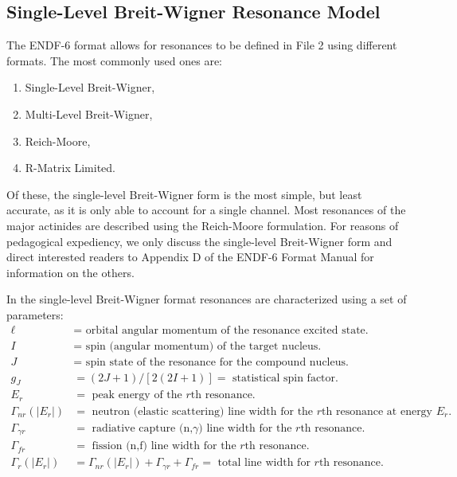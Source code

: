 \subsection{Single-Level Breit-Wigner Resonance Model}

The ENDF-6 format allows for resonances to be defined in File 2 using different formats. The most commonly used ones are:
\begin{enumerate}
  \item Single-Level Breit-Wigner,
  \item Multi-Level Breit-Wigner,
  \item Reich-Moore,
  \item R-Matrix Limited.
\end{enumerate}

Of these, the single-level Breit-Wigner form is the most simple, but least accurate, as it is only able to account for a single channel. Most resonances of the major actinides are described using the Reich-Moore formulation. For reasons of pedagogical expediency, we only discuss the single-level Breit-Wigner form and direct interested readers to Appendix D of the ENDF-6 Format Manual for information on the others. 

In the single-level Breit-Wigner format resonances are characterized using a set of parameters:
\begin{align}
  \ell 		&= \text{ orbital angular momentum of the resonance excited state.} \nonumber \\
  I    		&= \text{ spin (angular momentum) of the target nucleus.} \nonumber \\
  J			&= \text{ spin state of the resonance for the compound nucleus.} \nonumber \\
  g_J		&= (2J + 1)/[2(2I+1)] = \text{ statistical spin factor.} \nonumber \\
  E_r		&= \text{ peak energy of the $r$th resonance.} \nonumber \\
  \Gamma_{nr}(|E_r|) &= \text{ neutron (elastic scattering) line width for the $r$th resonance at energy $E_r$.} \nonumber \\
  \Gamma_{\gamma r}  &= \text{ radiative capture (n,$\gamma$) line width for the $r$th resonance.} \nonumber \\
  \Gamma_{fr} 		 &= \text{ fission (n,f) line width for the $r$th resonance.} \nonumber \\
  \Gamma_r(|E_r|)	 &= \Gamma_{nr}(|E_r|) + \Gamma_{\gamma r} + \Gamma_{fr} = \text{ total line width for $r$th resonance.} \nonumber
\end{align} 

